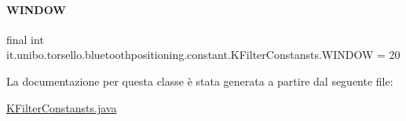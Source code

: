 \paragraph{\texorpdfstring{W\+I\+N\+D\+OW}{WINDOW}}
{\footnotesize\ttfamily final int it.\+unibo.\+torsello.\+bluetoothpositioning.\+constant.\+K\+Filter\+Constansts.\+W\+I\+N\+D\+OW = 20\hspace{0.3cm}{\ttfamily [static]}}



La documentazione per questa classe è stata generata a partire dal seguente file\+:\begin{DoxyCompactItemize}
\item 
\hyperlink{KFilterConstansts_8java}{K\+Filter\+Constansts.\+java}\end{DoxyCompactItemize}
